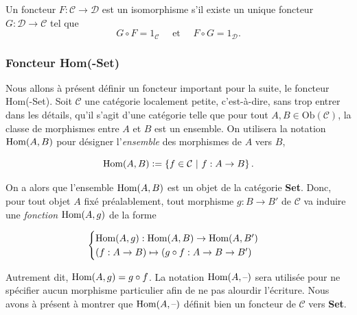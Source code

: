 \documentclass{article}
\begin{document}
\begin{example}[Isofoncteur]{}
    Un foncteur $F:\mathcal C\to\mathcal D$ est un isomorphisme s'il existe un unique foncteur $G:\mathcal D\to\mathcal C$ tel que $$G\circ F=1_\mathcal C\quad\text{ et }\quad F\circ G=1_\mathcal D.$$
\end{example}

\subsubsection{Foncteur Hom(-Set)}
Nous allons à présent définir un foncteur important pour la suite, le foncteur Hom(-Set). Soit $\mathcal C$ une catégorie localement petite, c'est-à-dire, sans trop entrer dans les détails, qu'il s'agit d'une catégorie telle que pour tout $A, B\in\text{Ob}(\mathcal C)$, la classe de morphismes entre $A$ et $B$ est un ensemble. On utilisera la notation $\text{Hom}(A, B)$ pour désigner l'\textit{ensemble} des morphismes de $A$ vers $B$,

$$
\Hom(A, B)\defeq\left\{f\in\mathcal C\ |\ f:A\to B\right\}.
$$

\noindent
On a alors que l'ensemble $\text{Hom}(A, B)$ est un objet de la catégorie \textbf{Set}. Donc, pour tout objet $A$ fixé préalablement, tout morphisme $g:B\to B'$ de $\mathcal C$ va induire une \textit{fonction} $\text{Hom}(A, g)$ de la forme

$$
\begin{cases}
    \text{Hom}(A, g):\text{Hom}(A, B)\to\text{Hom}(A, B')\\
    (f:A\to B)\mapsto(g\circ f:A\to B\to B')
\end{cases}
$$

\noindent
Autrement dit, $\text{Hom}(A, g)=g\circ f$. La notation $\text{Hom}(A, \text{--})$ sera utilisée pour ne spécifier aucun morphisme particulier afin de ne pas alourdir l'écriture. Nous avons à présent à montrer que $\text{Hom}(A, \text{--})$ définit bien un foncteur de $\mathcal C$ vers \textbf{Set}.
\end{document}
